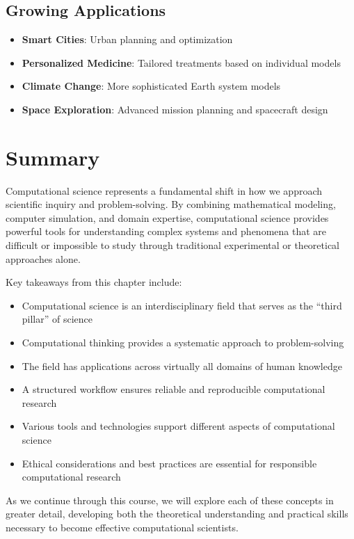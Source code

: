 \subsection{Growing Applications}
\begin{itemize}
  \item \textbf{Smart Cities}: Urban planning and optimization
  \item \textbf{Personalized Medicine}: Tailored treatments based on individual models
  \item \textbf{Climate Change}: More sophisticated Earth system models
  \item \textbf{Space Exploration}: Advanced mission planning and spacecraft design
\end{itemize}

\section{Summary}

Computational science represents a fundamental shift in how we approach scientific inquiry and problem-solving. By combining mathematical modeling, computer simulation, and domain expertise, computational science provides powerful tools for understanding complex systems and phenomena that are difficult or impossible to study through traditional experimental or theoretical approaches alone.

Key takeaways from this chapter include:

\begin{itemize}
  \item Computational science is an interdisciplinary field that serves as the ``third pillar'' of science
  \item Computational thinking provides a systematic approach to problem-solving
  \item The field has applications across virtually all domains of human knowledge
  \item A structured workflow ensures reliable and reproducible computational research
  \item Various tools and technologies support different aspects of computational science
  \item Ethical considerations and best practices are essential for responsible computational research
\end{itemize}

As we continue through this course, we will explore each of these concepts in greater detail, developing both the theoretical understanding and practical skills necessary to become effective computational scientists.

